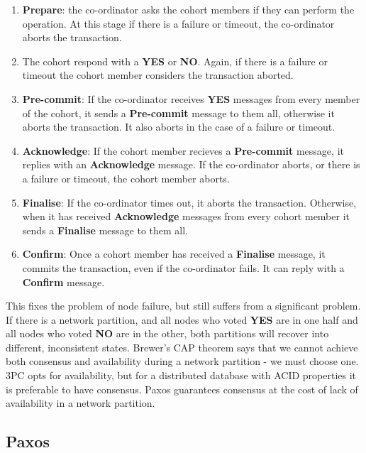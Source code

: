\documentclass[12pt,twoside,notitlepage]{report}
\newcommand{\msg}[1] {{\bf #1}}         %
\begin{document}
\begin{enumerate}
\item \msg{Prepare}: the co-ordinator asks the cohort members if they can perform the operation. At
	this stage if there is a failure or timeout, the co-ordinator aborts the transaction.
\item The cohort respond with a \msg{YES} or \msg{NO}. Again, if there is a failure or timeout the cohort
	member considers the transaction aborted.
\item \msg{Pre-commit}: If the co-ordinator receives \msg{YES} messages from every member of the
	cohort, it sends a \msg{Pre-commit} message to them all, otherwise it aborts the
	transaction. It also aborts in the case of a failure or timeout.
\item \msg{Acknowledge}: If the cohort member recieves a \msg{Pre-commit} message, it replies with
	an \msg{Acknowledge} message. If the co-ordinator aborts, or there is a failure or
	timeout, the cohort member aborts.
\item \msg{Finalise}: If the co-ordinator times out, it aborts the transaction. Otherwise, when it
	has received \msg{Acknowledge} messages from every cohort member it sends a \msg{Finalise}
	message to them all.
\item \msg{Confirm}: Once a cohort member has received a \msg{Finalise} message, it commits the
	transaction, even if the co-ordinator fails. It can reply with a \msg{Confirm} message.
\end{enumerate}

This fixes the problem of node failure, but still suffers from a significant problem. If there is
a network partition, and all nodes who voted \msg{YES} are in one half and all nodes who voted
\msg{NO} are in the other, both partitions will recover into different, inconsistent states.
Brewer's CAP theorem \cite{gilbert2002} says that we cannot achieve both consensus and availability
during a network partition - we must choose one. 3PC opts for availability, but for a distributed
database with ACID properties it is preferable to have consensus. Paxos guarantees consensus at
the cost of lack of availability in a network partition.

\subsection*{Paxos}
\end{document}
